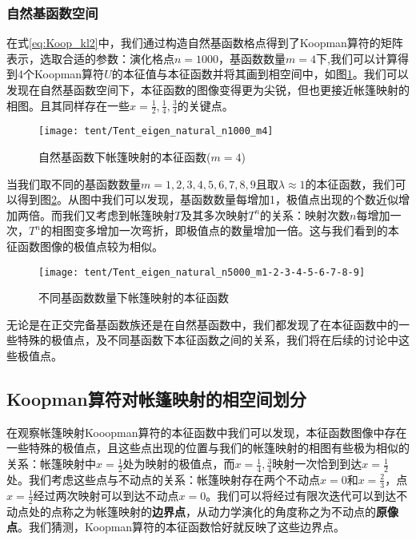 \subsubsection{自然基函数空间}
在式\eqref{eq:Koop_kl2}中，我们通过构造自然基函数格点得到了Koopman算符的矩阵表示，选取合适的参数：演化格点$n=1000$，基函数数量$m=4$下,我们可以计算得到4个Koopman算符$U$的本征值与本征函数并将其画到相空间中，如图\ref{fig:Tent_eigen_natural_n1000_m4}。我们可以发现在自然基函数空间下，本征函数的图像变得更为尖锐，但也更接近帐篷映射的相图。且其同样存在一些$x=\frac{1}{2},\frac{1}{4},\frac{3}{4}$的关键点。
\begin{figure}[!]
	\centering
	\texttt{[image: tent/Tent\_eigen\_natural\_n1000\_m4]}
    \caption{自然基函数下帐篷映射的本征函数($m=4$)}\label{fig:Tent_eigen_natural_n1000_m4}
\end{figure}

当我们取不同的基函数数量$m=1,2,3,4,5,6,7,8,9$且取$\lambda\approx 1$的本征函数，我们可以得到图\ref{Tent_eigen_natural_n5000_m1-2-3-4-5-6-7-8-9}。从图中我们可以发现，基函数数量每增加1，极值点出现的个数近似增加两倍。而我们又考虑到帐篷映射$T$及其多次映射$T^n$的关系：映射次数$n$每增加一次，$T^n$的相图变多增加一次弯折，即极值点的数量增加一倍。这与我们看到的本征函数图像的极值点较为相似。

\begin{figure}[!]
	\centering
	\texttt{[image: tent/Tent\_eigen\_natural\_n5000\_m1-2-3-4-5-6-7-8-9]}
    \caption{不同基函数数量下帐篷映射的本征函数}\label{Tent_eigen_natural_n5000_m1-2-3-4-5-6-7-8-9}
\end{figure}

无论是在正交完备基函数族还是在自然基函数中，我们都发现了在本征函数中的一些特殊的极值点，及不同基函数下本征函数之间的关系，我们将在后续的讨论中这些极值点。

\subsection{Koopman算符对帐篷映射的相空间划分}
在观察帐篷映射Kooopman算符的本征函数中我们可以发现，本征函数图像中存在一些特殊的极值点，且这些点出现的位置与我们的帐篷映射的相图有些极为相似的关系：帐篷映射中$x=\frac{1}{2}$处为映射的极值点，而$x=\frac{1}{4},\frac{3}{4}$映射一次恰到到达$x=\frac{1}{2}$处。我们考虑这些点与不动点的关系：帐篷映射存在两个不动点$x=0$和$x=\frac{2}{3}$，点$x=\frac{1}{2}$经过两次映射可以到达不动点$x=0$。我们可以将经过有限次迭代可以到达不动点处的点称之为帐篷映射的\textbf{边界点}，从动力学演化的角度称之为不动点的\textbf{原像点}。我们猜测，Koopman算符的本征函数恰好就反映了这些边界点。

